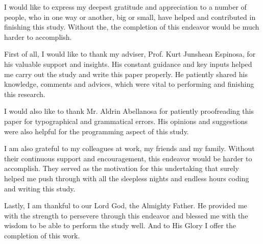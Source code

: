 \begin{acknowledgements}
I would like to express my deepest gratitude and appreciation to a number of
people, who in one way or another, big or small, have helped and contributed in
finishing this study. Without the, the completion of this endeavor would be much
harder to accomplish.

First of all, I would like to thank my adviser, Prof. Kurt Junshean Espinosa,
for his valuable support and insights. His constant guidance and key inputs
helped me carry out the study and write this paper properly. He patiently
shared his knowledge, comments and advices, which were vital to performing and
finishing this research.

I would also like to thank Mr. Aldrin Abellanosa for patiently proofreading this
paper for typographical and grammatical errors. His opinions and suggestions
were also helpful for the programming aspect of this study.

I am also grateful to my colleagues at work, my friends and my family. Without
their continuous support and encouragement, this endeavor would be harder to accomplish.
They served as the motivation for this undertaking that surely helped me push through
with all the sleepless nights and endless hours coding and writing this study.

Lastly, I am thankful to our Lord God, the Almighty Father. He provided me with
the strength to persevere through this endeavor and blessed me with the wisdom
to be able to perform the study well. And to His Glory I offer the completion
of this work.

\end{acknowledgements}
